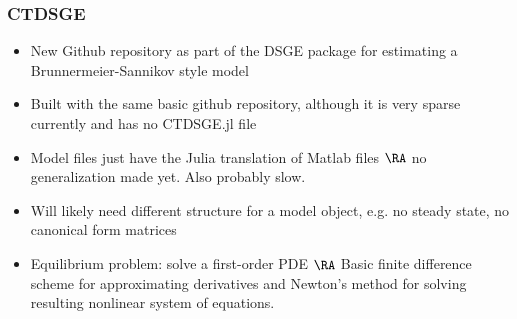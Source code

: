 \documentclass{beamer}
\begin{document}
\begin{frame}
  \frametitle{CTDSGE}
  \begin{itemize}
  \item New Github repository as part of the DSGE package for estimating a Brunnermeier-Sannikov style model
  \item Built with the same basic github repository, although it is very sparse currently and has no CTDSGE.jl file
  \item Model files just have the Julia translation of Matlab files $\RA$ no generalization made yet. Also probably slow.
  \item Will likely need different structure for a model object, e.g. no steady state, no canonical form matrices
  \item Equilibrium problem: solve a first-order PDE $\RA$ Basic finite difference scheme for approximating derivatives and Newton's method for solving resulting nonlinear system of equations.
  \end{itemize}
\end{frame}
\end{document}
